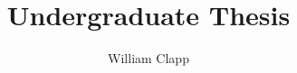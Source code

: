 \documentclass[prl,12pt,letterpaper]{revtex4-2}
\begin{document}
\title{Undergraduate Thesis}
\author{William Clapp}

\maketitle	




\end{document}
